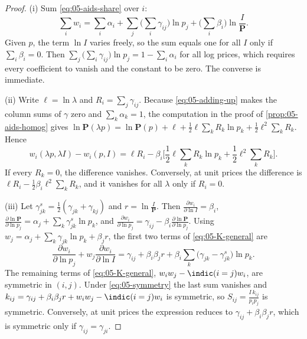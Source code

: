 \begin{proof}
(i) Sum \eqref{eq:05-aids-share} over $i$:
\begin{equation*}
\sum_iw_i = \sum_i\alpha_i + \sum_j\Big(\sum_i\gamma_{ij}\Big)\ln p_j + \Big(\sum_i\beta_i\Big)\ln\frac{I}{\mathbf{P}} .
\end{equation*}
Given $p$, the term $\ln I$ varies freely, so the sum equals one for all $I$ only if $\sum_i\beta_i = 0$.
Then $\sum_j\big(\sum_i\gamma_{ij}\big)\ln p_j = 1 - \sum_i\alpha_i$ for all log prices, which requires every
coefficient to vanish and the constant to be zero. The converse is immediate.

(ii) Write $\ell = \ln\lambda$ and $R_i = \sum_j\gamma_{ij}$. Because \eqref{eq:05-adding-up} makes the
column sums of $\gamma$ zero and $\sum_k\alpha_k = 1$, the computation in the proof of
\cref{prop:05-aids-homog} gives
$\ln\mathbf{P}(\lambda p) = \ln\mathbf{P}(p) + \ell + \frac{1}{2}\ell\sum_kR_k\ln p_k + \frac{1}{2}\ell^2\sum_kR_k$.
Hence
\begin{equation*}
w_i(\lambda p, \lambda I) - w_i(p, I) = \ell R_i - \beta_i\Big[\frac{1}{2}\ell\sum_kR_k\ln p_k +
\frac{1}{2}\ell^2\sum_kR_k\Big].
\end{equation*}
If every $R_k = 0$, the difference vanishes. Conversely, at unit prices the difference is
$\ell R_i - \frac{1}{2}\beta_i\ell^2\sum_kR_k$, and it vanishes for all $\lambda$ only if $R_i = 0$.

(iii) Let $\gamma^s_{jk} = \frac{1}{2}(\gamma_{jk} + \gamma_{kj})$ and $r = \ln\frac{I}{\mathbf{P}}$. Then
$\frac{\partial w_i}{\partial\ln I} = \beta_i$, $\frac{\partial\ln\mathbf{P}}{\partial\ln p_j} = \alpha_j +
\sum_k\gamma^s_{jk}\ln p_k$, and
$\frac{\partial w_i}{\partial\ln p_j} = \gamma_{ij} - \beta_i\frac{\partial\ln\mathbf{P}}{\partial\ln p_j}$.
Using $w_j = \alpha_j + \sum_k\gamma_{jk}\ln p_k + \beta_jr$, the first two terms of \eqref{eq:05-K-general}
are
\begin{equation*}
\frac{\partial w_i}{\partial\ln p_j} + w_j\frac{\partial w_i}{\partial\ln I}
= \gamma_{ij} + \beta_i\beta_jr + \beta_i\sum_k\big(\gamma_{jk} - \gamma^s_{jk}\big)\ln p_k .
\end{equation*}
The remaining terms of \eqref{eq:05-K-general}, $w_iw_j - \indic(i=j)w_i$, are symmetric in $(i, j)$. Under
\eqref{eq:05-symmetry} the last sum vanishes and $k_{ij} = \gamma_{ij} + \beta_i\beta_jr + w_iw_j -
\indic(i=j)w_i$ is symmetric, so $S_{ij} = \frac{I\,k_{ij}}{p_ip_j}$ is symmetric. Conversely, at unit prices the
expression reduces to $\gamma_{ij} + \beta_i\beta_jr$, which is symmetric only if $\gamma_{ij} = \gamma_{ji}$.
\end{proof}


